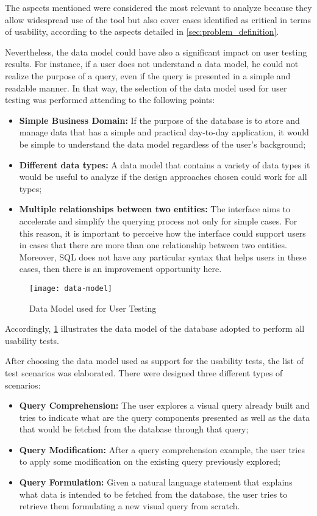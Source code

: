 The aspects mentioned were considered the most relevant to analyze because they allow widespread use of the tool but also cover cases identified as critical in terms of usability, according to the aspects detailed in \ref{sec:problem_definition}.

Nevertheless, the data model could have also a significant impact on user testing results. For instance, if a user does not understand a data model, he could not realize the purpose of a query, even if the query is presented in a simple and readable manner. In that way, the selection of the data model used for user testing was performed attending to the following points:

\begin{itemize}
    \item \textbf{Simple Business Domain: }If the purpose of the database is to store and manage data that has a simple and practical day-to-day application, it would be simple to understand the data model regardless of the user's background;
    \item \textbf{Different data types: }A data model that contains a variety of data types it would be useful to analyze if the design approaches chosen could work for all types;
    \item \textbf{Multiple relationships between two entities: }The interface aims to accelerate and simplify the querying process not only for simple cases. For this reason, it is important to perceive how the interface could support users in cases that there are more than one relationship between two entities. Moreover, \gls{SQL} does not have any particular syntax that helps users in these cases, then there is an improvement opportunity here.
\end{itemize}

\begin{figure}[htbp]
	\centering
	\texttt{[image: data-model]}
	\caption{Data Model used for User Testing}
	\label{fig:dataModel}
\end{figure}

Accordingly, \ref{fig:dataModel} illustrates the data model of the database adopted to perform all usability tests.

After choosing the data model used as support for the usability tests, the list of test scenarios was elaborated. There were designed three different types of scenarios:

\begin{itemize}
    \item \textbf{Query Comprehension: } The user explores a visual query already built and tries to indicate what are the query components presented as well as the data that would be fetched from the database through that query;
    \item \textbf{Query Modification: } After a query comprehension example, the user tries to apply some modification on the existing query previously explored;
    \item \textbf{Query Formulation: } Given a natural language statement that explains what data is intended to be fetched from the database, the user tries to retrieve them formulating a new visual query from scratch.
\end{itemize}

